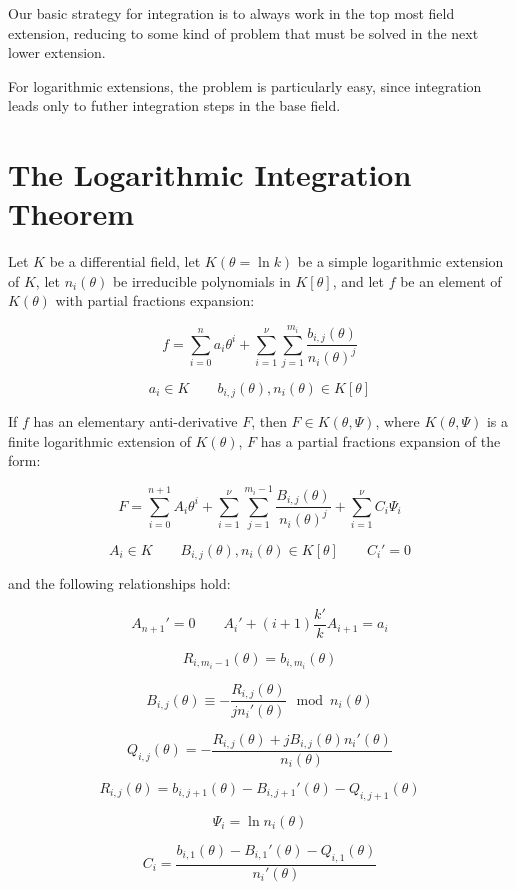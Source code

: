 

Our basic strategy for integration is to always work in the top most
field extension, reducing to some kind of problem that must be
solved in the next lower extension.

For logarithmic extensions, the problem is particularly easy,
since integration leads only to futher integration steps
in the base field.

\vfill\eject
\section{The Logarithmic Integration Theorem}

\theorem\label{logarithmic integration theorem}
Let $K$ be a differential field, let $K(\theta = \ln k)$ be a simple
logarithmic extension of $K$, let $n_i(\theta)$ be
irreducible polynomials in $K[\theta]$,
and let $f$ be an element of $K(\theta)$
with partial fractions expansion:

$$f = \sum_{i=0}^n a_i \theta^i
+ \sum_{i=1}^\nu \sum_{j=1}^{m_i} \frac{b_{i,j}(\theta)}{n_i(\theta)^j}$$

$$a_i \in K \qquad b_{i,j}(\theta),n_i(\theta) \in K[\theta]$$

If $f$ has
an elementary anti-derivative $F$, then $F \in K(\theta, \Psi)$,
where $K(\theta, \Psi)$ is a finite logarithmic extension
of $K(\theta)$, $F$ has a partial fractions expansion of the form:

$$F = \sum_{i=0}^{n+1} A_i \theta^i
+ \sum_{i=1}^\nu \sum_{j=1}^{m_i-1} \frac{B_{i,j}(\theta)}{n_i(\theta)^j}
+ \sum_{i=1}^\nu C_i \Psi_i$$

$$A_i \in K \qquad B_{i,j}(\theta),n_i(\theta) \in K[\theta] \qquad C_i' = 0$$

and the following relationships hold:

$$ A_{n+1}' = 0 \qquad A_i' + (i+1) \frac{k'}{k} A_{i+1} = a_i $$

$$ R_{i,m_i-1}(\theta) = b_{i,m_i}(\theta) $$

$$ B_{i,j}(\theta) \equiv - \frac{R_{i,j}(\theta)}{j n_i'(\theta) } \mod n_i(\theta)$$

$$ Q_{i,j}(\theta) = - \frac{R_{i,j}(\theta) + j B_{i,j}(\theta) n_i'(\theta)}{n_i(\theta)}$$

$$ R_{i,j}(\theta) = b_{i,j+1}(\theta) - B_{i,j+1}'(\theta) - Q_{i,j+1}(\theta) $$

$$ \Psi_i = \ln n_i(\theta)$$

$$ C_i = \frac{b_{i,1}(\theta) - B_{i,1}'(\theta) - Q_{i,1}(\theta)}{n_i'(\theta)} $$

